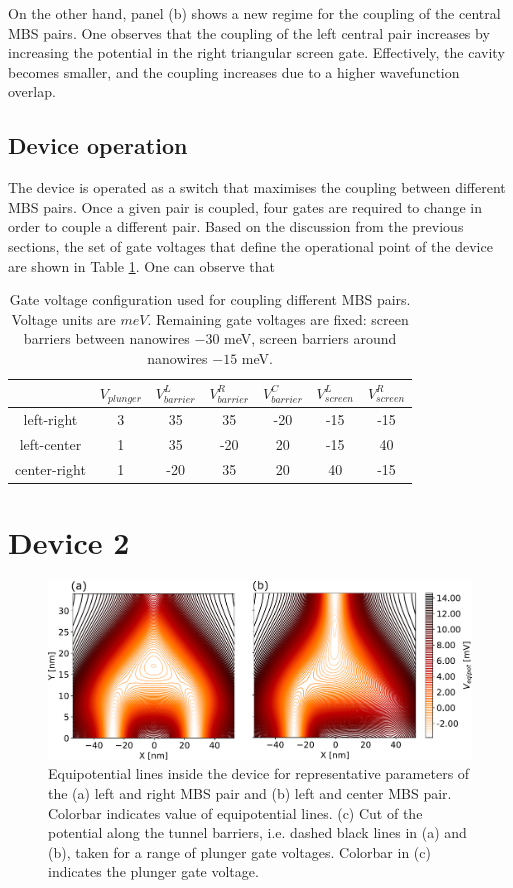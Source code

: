 On the other hand, panel (b) shows a new regime for the coupling of the central MBS pairs.
One observes that the coupling of the left central pair increases by increasing the potential in the right triangular screen gate.
Effectively, the cavity becomes smaller, and the coupling increases due to a higher wavefunction overlap.

\subsection{Device operation}

The device is operated as a switch that maximises the coupling between different MBS pairs.
Once a given pair is coupled, four gates are required to change in order to couple a different pair.
Based on the discussion from the previous sections, the set of gate voltages that define the operational point of the device are shown in Table \ref{table:gate_voltages}.
One can observe that 

\begin{table}[h!]
\centering
\begin{tabular}{||c || c c c c c c ||} 
 \hline
& $V_{plunger}$ & $V_{barrier}^L$ & $V_{barrier}^R$ & $V_{barrier}^C$ & $V_{screen}^L$ & $V_{screen}^R$ \\
 \hline\hline
 left-right & 3 & 35 & 35 & -20 & -15 & -15\\ 
 \hline
 left-center & 1 & 35 & -20 & 20 & -15 & 40\\ 
 \hline
 center-right & 1 & -20 & 35 & 20 & 40 & -15\\ 
 \hline
 \hline
\end{tabular}
\caption{Gate voltage configuration used for coupling different MBS pairs. Voltage units are $meV$. Remaining gate voltages are fixed: screen barriers between nanowires $-30$ meV, screen barriers around nanowires $-15$ meV.}
\label{table:gate_voltages}
\end{table}

\section{Device 2}

\begin{figure}[h!]
\centering
  \includegraphics[width=0.7\linewidth]{figures/device_2_potential.pdf}
  \caption{Equipotential lines inside the device for representative parameters of the (a) left and right MBS pair and (b) left and center MBS pair. Colorbar indicates value of equipotential lines. (c) Cut of the potential along the tunnel barriers, i.e. dashed black lines in (a) and (b), taken for a range of plunger gate voltages. Colorbar in (c) indicates the plunger gate voltage.}
  \label{fig:device_2_barriers}
\end{figure}

